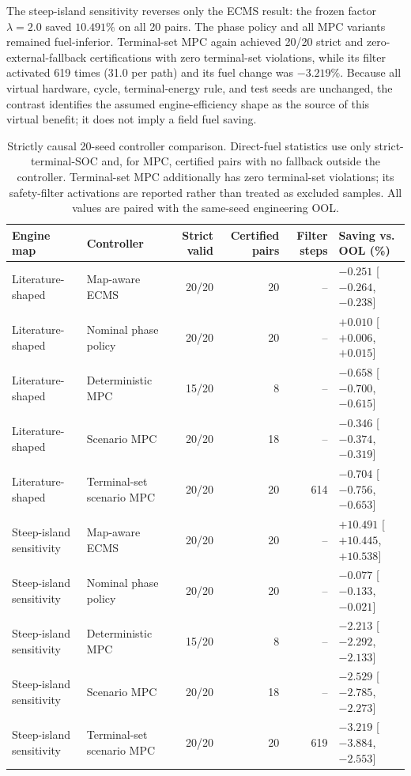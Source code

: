\documentclass[agriengineering,article,submit,moreauthors]{Definitions/mdpi}
\begin{document}
The steep-island sensitivity reverses only the ECMS result: the frozen factor $\lambda=2.0$ saved $10.491\%$ on all 20 pairs. The phase policy and all MPC variants remained fuel-inferior. Terminal-set MPC again achieved 20/20 strict and zero-external-fallback certifications with zero terminal-set violations, while its filter activated 619 times (31.0 per path) and its fuel change was $-3.219\%$. Because all virtual hardware, cycle, terminal-energy rule, and test seeds are unchanged, the contrast identifies the assumed engine-efficiency shape as the source of this virtual benefit; it does not imply a field fuel saving.

\begin{table}[H]
\centering
\caption{Strictly causal 20-seed controller comparison. Direct-fuel statistics use only strict-terminal-SOC and, for MPC, certified pairs with no fallback outside the controller. Terminal-set MPC additionally has zero terminal-set violations; its safety-filter activations are reported rather than treated as excluded samples. All values are paired with the same-seed engineering OOL.}
\label{tab:framework}
\scriptsize
\setlength{\tabcolsep}{3pt}
\begin{tabular}{llrrrl}
\toprule
Engine map & Controller & Strict valid & Certified pairs & Filter steps & Saving vs. OOL (\%) \\
\midrule
Literature-shaped & Map-aware ECMS & 20/20 & 20 & -- & $-0.251$ [$-0.264$, $-0.238$] \\
Literature-shaped & Nominal phase policy & 20/20 & 20 & -- & $+0.010$ [$+0.006$, $+0.015$] \\
Literature-shaped & Deterministic MPC & 15/20 & 8 & -- & $-0.658$ [$-0.700$, $-0.615$] \\
Literature-shaped & Scenario MPC & 20/20 & 18 & -- & $-0.346$ [$-0.374$, $-0.319$] \\
Literature-shaped & Terminal-set scenario MPC & 20/20 & 20 & 614 & $-0.704$ [$-0.756$, $-0.653$] \\
\midrule
Steep-island sensitivity & Map-aware ECMS & 20/20 & 20 & -- & $+10.491$ [$+10.445$, $+10.538$] \\
Steep-island sensitivity & Nominal phase policy & 20/20 & 20 & -- & $-0.077$ [$-0.133$, $-0.021$] \\
Steep-island sensitivity & Deterministic MPC & 15/20 & 8 & -- & $-2.213$ [$-2.292$, $-2.133$] \\
Steep-island sensitivity & Scenario MPC & 20/20 & 18 & -- & $-2.529$ [$-2.785$, $-2.273$] \\
Steep-island sensitivity & Terminal-set scenario MPC & 20/20 & 20 & 619 & $-3.219$ [$-3.884$, $-2.553$] \\
\bottomrule
\end{tabular}
\end{table}
\end{document}
